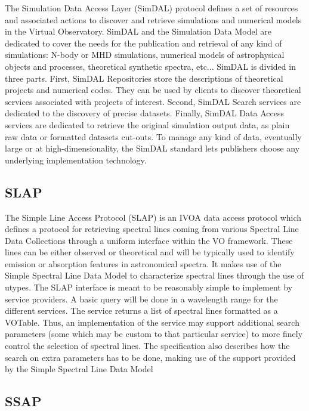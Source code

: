 \documentclass[11pt,letter]{ivoa}
\begin{document}
The Simulation Data Access Layer (SimDAL) \citep{2017ivoa.spec.0320L} protocol defines a set of resources and associated 
actions to discover and retrieve simulations and numerical models in the Virtual Observatory. 
SimDAL and the Simulation Data Model are dedicated to cover the needs for the publication 
and retrieval of any kind of simulations: N-body or MHD simulations, numerical models of 
astrophysical objects and processes, theoretical synthetic spectra, etc... SimDAL is 
divided in three parts. First, SimDAL Repositories store the descriptions of theoretical 
projects and numerical codes. They can be used by clients to discover theoretical 
services associated with projects of interest. Second, SimDAL Search services are 
dedicated to the discovery of precise datasets. Finally, SimDAL Data Access services 
are dedicated to retrieve the original simulation output data, as plain raw data or 
formatted datasets cut-outs. To manage any kind of data, eventually large or at 
high-dimensionality, the SimDAL standard lets publishers choose any underlying 
implementation technology. 

\subsection{SLAP}

The Simple Line Access Protocol (SLAP) \citep{2010ivoa.specQ1209O} is an IVOA data access protocol which defines a protocol 
for retrieving spectral lines coming from various Spectral Line Data Collections through a 
uniform interface within the VO framework. These lines can be either observed or theoretical 
and will be typically used to identify emission or absorption features in astronomical 
spectra. It makes use of the Simple Spectral Line Data Model to characterize spectral lines 
through the use of utypes. The SLAP interface is meant to be reasonably simple to implement 
by service providers. A basic query will be done in a wavelength range for the different 
services. The service returns a list of spectral lines formatted as a VOTable. Thus, an 
implementation of the service may support additional search parameters (some which may be 
custom to that particular service) to more finely control the selection of spectral lines.
The specification also describes how the search on extra parameters has to be done, making 
use of the support provided by the Simple Spectral Line Data Model

\subsection{SSAP}
\end{document}
